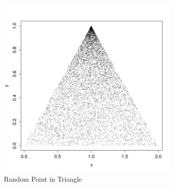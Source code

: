 \documentclass[master,english]{hgbthesis}
\begin{document}
\begin{figure}

	\centering

	\begin{subfigure}[b]{0.45\textwidth}

		\includegraphics[width=\textwidth]{randompointpolygon.png}

		\caption{Random Point in Triangle}

		\label{fig:randtriangle}

	\end{subfigure}%

	~ %


	\begin{subfigure}[b]{0.45\textwidth}


\end{subfigure}
\end{figure}
\end{document}
